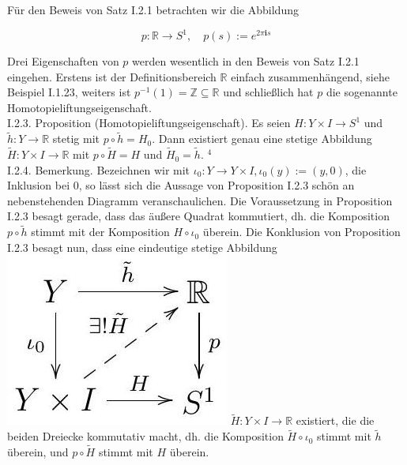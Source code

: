 \documentclass[10pt, letterpaper]{article}
\begin{document}
Für den Beweis von Satz I.2.1 betrachten wir die Abbildung

$$
p: \mathbb{R} \rightarrow S^{1}, \quad p(s):=e^{2 \pi \mathbf{i} s}
$$

Drei Eigenschaften von $p$ werden wesentlich in den Beweis von Satz I.2.1 eingehen. Erstens ist der Definitionsbereich $\mathbb{R}$ einfach zusammenhängend, siehe Beispiel I.1.23, weiters ist $p^{-1}(1)=\mathbb{Z} \subseteq \mathbb{R}$ und schließlich hat $p$ die sogenannte Homotopieliftungseigenschaft.\\
I.2.3. Proposition (Homotopieliftungseigenschaft). Es seien $H: Y \times I \rightarrow S^{1}$ und $\tilde{h}: Y \rightarrow \mathbb{R}$ stetig mit $p \circ \tilde{h}=H_{0}$. Dann existiert genau eine stetige Abbildung $\tilde{H}: Y \times I \rightarrow \mathbb{R}$ mit $p \circ \tilde{H}=H$ und $\tilde{H}_{0}=\tilde{h}$. ${ }^{4}$\\
I.2.4. Bemerkung. Bezeichnen wir mit $\iota_{0}: Y \rightarrow Y \times I, \iota_{0}(y):=(y, 0)$, die Inklusion bei 0, so lässt sich die Aussage von Proposition I.2.3 schön an nebenstehenden Diagramm veranschaulichen. Die Voraussetzung in Proposition I.2.3 besagt gerade, dass das äußere Quadrat kommutiert, dh. die Komposition $p \circ \tilde{h}$ stimmt mit der Komposition $H \circ \iota_{0}$ überein. Die Konklusion von Proposition I.2.3 besagt nun, dass eine eindeutige stetige Abbildung\\
\includegraphics[max width=\textwidth]{2025_06_05_d7ed2bacd1e9ce1db1f0g-015} $\tilde{H}: Y \times I \rightarrow \mathbb{R}$ existiert, die die beiden Dreiecke kommutativ macht, dh. die Komposition $\tilde{H} \circ \iota_{0}$ stimmt mit $\tilde{h}$ überein, und $p \circ \tilde{H}$ stimmt mit $H$ überein.\\
\end{document}
